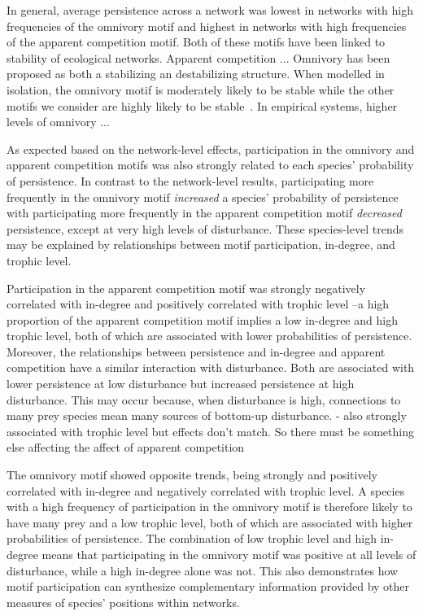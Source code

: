 \documentclass[12pt]{article}
\begin{document}
\begin{spacing}{2.0}
    In general, average persistence across a network was lowest in networks with high frequencies of the omnivory motif and highest in networks with high frequencies of the apparent competition motif. 
    Both of these motifs have been linked to stability of ecological networks.
    Apparent competition ...
    Omnivory has been proposed as both a stabilizing an destabilizing structure.
    When modelled in isolation, the omnivory motif is moderately likely to be stable while the other motifs we consider are highly likely to be stable~\citep{Borrelli2015a}.
    In empirical systems, higher levels of omnivory ...
    
    
    As expected based on the network-level effects, participation in the omnivory and apparent competition motifs was also strongly related to each species' probability of persistence.
    In contrast to the network-level results, participating more frequently in the omnivory motif \emph{increased} a species' probability of persistence with participating more frequently in the apparent competition motif \emph{decreased} persistence, except at very high levels of disturbance.
    These species-level trends may be explained by relationships between motif participation, in-degree, and trophic level.
    
    
    Participation in the apparent competition motif was strongly negatively correlated with in-degree and positively correlated with trophic level --a high proportion of the apparent competition motif implies a low in-degree and high trophic level, both of which are associated with lower probabilities of persistence.
    Moreover, the relationships between persistence and in-degree and apparent competition have a similar interaction with disturbance.
    Both are associated with lower persistence at low disturbance but increased persistence at high disturbance. 
    This may occur because, when disturbance is high, connections to many prey species mean many sources of bottom-up disturbance.
    - also strongly associated with trophic level but effects don't match. So there must be something else affecting the affect of apparent competition
    
    
    The omnivory motif showed opposite trends, being strongly and positively correlated with in-degree and negatively correlated with trophic level.
    A species with a high frequency of participation in the omnivory motif is therefore likely to have many prey and a low trophic level, both of which are associated with higher probabilities of persistence.
    The combination of low trophic level and high in-degree means that participating in the omnivory motif was positive at all levels of disturbance, while a high in-degree alone was not.
    This also demonstrates how motif participation can synthesize complementary information provided by other measures of species' positions within networks. 



\end{spacing}
\end{document}
